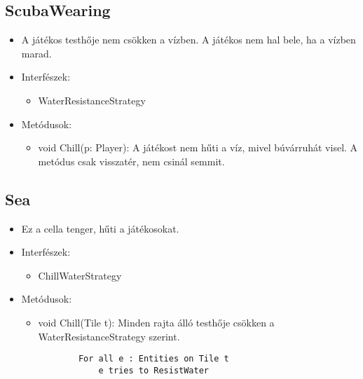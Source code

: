 \subsection{ScubaWearing}
\begin{itemize}
	\item A játékos testhője nem csökken a vízben. A játékos nem hal bele, ha a vízben marad.
	\item Interfészek:
	\begin{itemize}
		\item WaterResistanceStrategy
	\end{itemize}
	\item Metódusok:
	\begin{itemize}
		\item void Chill(p: Player): A játékost nem hűti a víz, mivel búvárruhát visel. A metódus csak visszatér, nem csinál semmit.
	\end{itemize}
\end{itemize}

\subsection{Sea}
\begin{itemize}
	\item Ez a cella tenger, hűti a játékosokat.
	\item Interfészek:
	\begin{itemize}
		\item ChillWaterStrategy
	\end{itemize}
	\item Metódusok:
	\begin{itemize}
		\item void Chill(Tile t): Minden rajta álló testhője csökken a WaterResistanceStrategy szerint.
		\begin{lstlisting}
		For all e : Entities on Tile t
			e tries to ResistWater
		\end{lstlisting}
	\end{itemize}
\end{itemize}

